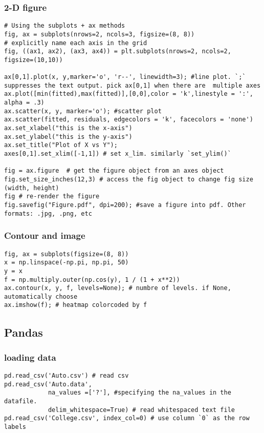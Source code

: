 \documentclass[
  letterpaper,
  DIV=11,
  numbers=noendperiod]{scrreprt}
\begin{document}
\subsubsection{2-D figure}\label{d-figure}

\begin{verbatim}
# Using the subplots + ax methods
fig, ax = subplots(nrows=2, ncols=3, figsize=(8, 8)) 
# explicitly name each axis in the grid 
fig, ((ax1, ax2), (ax3, ax4)) = plt.subplots(nrows=2, ncols=2, figsize=(10,10))

ax[0,1].plot(x, y,marker='o', 'r--', linewidth=3); #line plot. `;` suppresses the text output. pick ax[0,1] when there are  multiple axes
ax.plot([min(fitted),max(fitted)],[0,0],color = 'k',linestyle = ':', alpha = .3)
ax.scatter(x, y, marker='o'); #scatter plot
ax.scatter(fitted, residuals, edgecolors = 'k', facecolors = 'none')
ax.set_xlabel("this is the x-axis")
ax.set_ylabel("this is the y-axis")
ax.set_title("Plot of X vs Y");
axes[0,1].set_xlim([-1,1]) # set x_lim. similarly `set_ylim()`

fig = ax.figure  # get the figure object from an axes object
fig.set_size_inches(12,3) # access the fig object to change fig size (width, height)
fig # re-render the figure
fig.savefig("Figure.pdf", dpi=200); #save a figure into pdf. Other formats: .jpg, .png, etc
\end{verbatim}

\subsubsection{Contour and image}\label{contour-and-image}

\begin{verbatim}
fig, ax = subplots(figsize=(8, 8))
x = np.linspace(-np.pi, np.pi, 50)
y = x
f = np.multiply.outer(np.cos(y), 1 / (1 + x**2))
ax.contour(x, y, f, levels=None); # numbre of levels. if None, automatically choose
ax.imshow(f); # heatmap colorcoded by f
\end{verbatim}

\subsection{Pandas}\label{pandas}

\subsubsection{loading data}\label{loading-data}

\begin{verbatim}
pd.read_csv('Auto.csv') # read csv
pd.read_csv('Auto.data', 
            na_values =['?'], #specifying the na_values in the datafile. 
            delim_whitespace=True) # read whitespaced text file
pd.read_csv('College.csv', index_col=0) # use column `0` as the row labels 
\end{verbatim}
\end{document}
